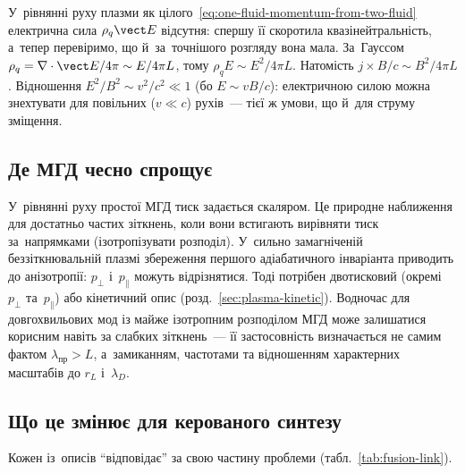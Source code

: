 У~рівнянні руху плазми як цілого~\eqref{eq:one-fluid-momentum-from-two-fluid} електрична сила
$\rho_q\vect E$ відсутня: спершу її скоротила квазінейтральність, а~тепер перевіримо, що
й~за~точнішого розгляду вона мала. За~Гауссом
$\rho_q=\nabla\cdot\vect E/4\pi\sim E/4\pi L$, тому $\rho_qE\sim E^2/4\pi L$. Натомість
$j\times B/c\sim B^2/4\pi L$. Відношення $E^2/B^2\sim v^2/c^2\ll1$ (бо $E\sim vB/c$):
електричною силою можна знехтувати для повільних ($v\ll c$) рухів~--- тієї ж умови, що
й~для струму зміщення.


\subsection*{Де МГД чесно спрощує}


У~рівнянні руху простої МГД тиск задається скаляром. Це природне наближення для достатньо
частих зіткнень, коли вони встигають вирівняти тиск за~напрямками (ізотропізувати розподіл). У~сильно замагніченій
беззіткнювальній плазмі збереження першого адіабатичного інваріанта приводить до
анізотропії: $p_\perp$ і~$p_\parallel$ можуть відрізнятися. Тоді потрібен двотисковий
(окремі $p_\perp$ та~$p_\parallel$) або кінетичний опис (розд.~\ref{sec:plasma-kinetic}). Водночас
для довгохвильових мод із майже ізотропним розподілом МГД може залишатися корисним навіть
за слабких зіткнень~--- її застосовність визначається не самим фактом $\lambda_{\mathrm{пр}}>L$,
а~замиканням, частотами та відношенням характерних масштабів до $r_L$ і~$\lambda_D$.


\subsection*{Що це змінює для керованого синтезу}


Кожен із~описів \enquote{відповідає} за свою частину проблеми
(табл.~\ref{tab:fusion-link}).


